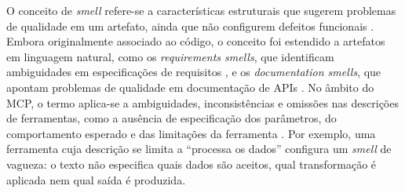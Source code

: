 O conceito de \textit{smell} refere-se a características estruturais que sugerem problemas de qualidade em um artefato, ainda que não configurem defeitos funcionais \cite{2026arXiv260214878M}. Embora originalmente associado ao código, o conceito foi estendido a artefatos em linguagem natural, como os \textit{requirements smells}, que identificam ambiguidades em especificações de requisitos \cite{femmer2017}, e os \textit{documentation smells}, que apontam problemas de qualidade em documentação de APIs \cite{khan2021}. No âmbito do MCP, o termo aplica-se a ambiguidades, inconsistências e omissões nas descrições de ferramentas, como a ausência de especificação dos parâmetros, do comportamento esperado e das limitações da ferramenta \cite{2026arXiv260214878M}. Por exemplo, uma ferramenta cuja descrição se limita a ``processa os dados'' configura um \textit{smell} de vagueza: o texto não especifica quais dados são aceitos, qual transformação é aplicada nem qual saída é produzida.
